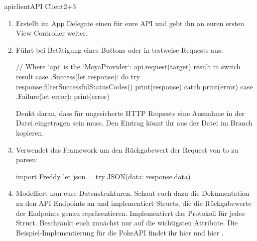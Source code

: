 \documentclass[parskip=half, final]{scrreprt}
\begin{document}
\begin{lecture}
\begin{exc}
\begin{excitem}{apiclient}{API Client}{2+3}
\begin{enumerate}[label=\arabic*.]
Die Modellierung der PokeAPI findet ihr hier .
\item Erstellt im App Delegate einen  für eure API und gebt ihn an euren ersten View Controller weiter.
\item Führt bei Betätigung eines Buttons oder in  testweise Requests aus:
\begin{swiftcode}
            // Where `api` is the `MoyaProvider`:
            api.request(target) { result in
                switch result {
                case .Success(let response):
                    do {
                        try response.filterSuccessfulStatusCodes()
                        print(response)
                    } catch {
                        print(error)
                    }
                case .Failure(let error):
                    print(error)
                }
            }
\end{swiftcode}
Denkt daran, dass für ungesicherte HTTP Requests eine  Ausnahme in der  Datei eingetragen sein muss. Den Eintrag könnt ihr aus der  Datei im  Branch  kopieren.
\item Verwendet das  Framework um den Rückgabewert der Request von  to  zu parsen:
\begin{swiftcode}
import Freddy
let json = try JSON(data: response.data)
\end{swiftcode}
\item Modelliert nun eure Datenstrukturen. Schaut euch dazu die Dokumentation zu den API Endpoints an und implementiert Structs, die die Rückgabewerte der Endpoints genau repräsentieren. Implementiert das  Protokoll für jedes Struct. Beschränkt euch zunächst nur auf die wichtigsten Attribute. Die Beispiel-Implementierung für die PokeAPI findet ihr hier  und hier .

\end{enumerate}
\end{excitem}
\end{exc}
\end{lecture}
\end{document}
